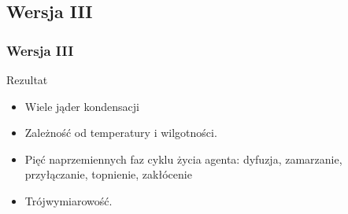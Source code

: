 \documentclass[]{beamer}
\begin{document}
\subsection{Wersja III}

\begin{frame}
	\frametitle{Wersja III}
	\begin{block}{Rezultat}
		\begin{itemize}
	 		\item Wiele jąder kondensacji
			\item Zależność od temperatury i wilgotności.
			\item Pięć naprzemiennych faz cyklu życia agenta: dyfuzja, zamarzanie, przyłączanie, topnienie, zakłócenie 
			\item Trójwymiarowość.
		\end{itemize}
	\end{block}
\end{frame}
\end{document}

